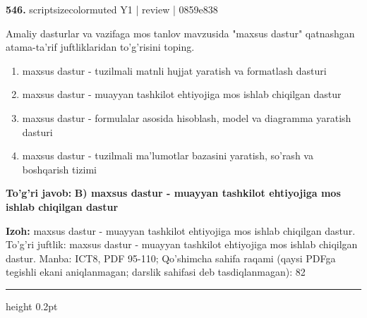 \documentclass[10pt,a4paper]{article}
\begin{document}
{\bfseries\sffamily\color{ink} 546.} {scriptsizecolor{muted} Y1 | review | 0859e838}
\par
Amaliy dasturlar va vazifaga mos tanlov mavzusida "maxsus dastur" qatnashgan atama-ta'rif juftliklaridan to'g'risini toping.
\begin{enumerate}[label=\Alph*),leftmargin=9mm]
\item maxsus dastur - tuzilmali matnli hujjat yaratish va formatlash dasturi
\item maxsus dastur - muayyan tashkilot ehtiyojiga mos ishlab chiqilgan dastur
\item maxsus dastur - formulalar asosida hisoblash, model va diagramma yaratish dasturi
\item maxsus dastur - tuzilmali ma'lumotlar bazasini yaratish, so'rash va boshqarish tizimi
\end{enumerate}
\begin{tcolorbox}[enhanced,breakable,colback=teal!4,colframe=teal!60!black,boxrule=0.45pt,arc=1.2mm,left=2.7mm,right=2.7mm,top=1.8mm,bottom=1.8mm,before skip=2mm,after skip=2mm]
{\bfseries\sffamily\color{teal}To'g'ri javob:} \textbf{B) maxsus dastur - muayyan tashkilot ehtiyojiga mos ishlab chiqilgan dastur}
\par\smallskip
{\bfseries Izoh:} maxsus dastur - muayyan tashkilot ehtiyojiga mos ishlab chiqilgan dastur. To'g'ri juftlik: maxsus dastur - muayyan tashkilot ehtiyojiga mos ishlab chiqilgan dastur. Manba: ICT8, PDF 95-110; Qo'shimcha sahifa raqami (qaysi PDFga tegishli ekani aniqlanmagan; darslik sahifasi deb tasdiqlanmagan): 82
\end{tcolorbox}
\vspace{2mm}\hrule height 0.2pt\vspace{3mm}
\end{document}
